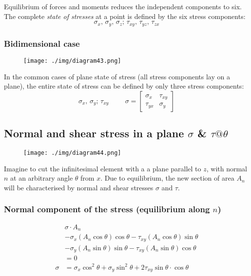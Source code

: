 Equilibrium of forces and moments reduces the independent components to six. The complete \textit{state of stresses} at a point is defined by the six stress components:
\begin{equation}
  \sigma_x, \, \sigma_y, \, \sigma_z; \, \tau_{xy}, \, \tau_{yz}, \, \tau_{zx}
\end{equation}
\subsubsection{Bidimensional case}
\begin{figure}[H]
  \centering
  \texttt{[image: ./img/diagram43.png]}
  \caption{}
\end{figure}
In the common cases of plane state of stress (all stress components lay on a plane), the entire state of stress can be defined by only three stress components:
\begin{equation}
  \sigma_x, \, \sigma_y; \, \tau_{xy} \hspace{1cm} \sigma = \begin{bmatrix}
    \sigma_x  & \tau_{xy} \\
    \tau_{yx} & \sigma_y
  \end{bmatrix}
\end{equation}
\subsection{Normal and shear stress in a plane $\sigma$ \& $\tau @ \theta$}
\begin{figure}[H]
  \centering
  \texttt{[image: ./img/diagram44.png]}
  \caption{}
\end{figure}
Imagine to cut the infinitesimal element with a a plane parallel to $z$, with normal $n$ at an arbitrary angle $\theta$ from $x$. Due to equilibrium, the new section of area $A_n$ will be characterised by normal and shear stresses $\sigma$ and $\tau$.
\subsubsection{Normal component of the stress (equilibrium along $n$)}
\begin{align}
         & \sigma \cdot A_n                                                                                  \\
         & -\sigma_x \left(A_n \cos \theta\right)\cos\theta - \tau_{xy} \left(A_n\cos\theta\right)\sin\theta \\
         & -\sigma_y \left(A_n\sin\theta\right)\sin\theta - \tau_{xy}\left(A_n\sin\theta\right)\cos\theta    \\
         & =0                                                                                                \\
  \sigma & = \sigma_x \cos^2 \theta + \sigma_y \sin^2 \theta + 2\tau_{xy} \sin\theta \cdot \cos\theta
\end{align}
